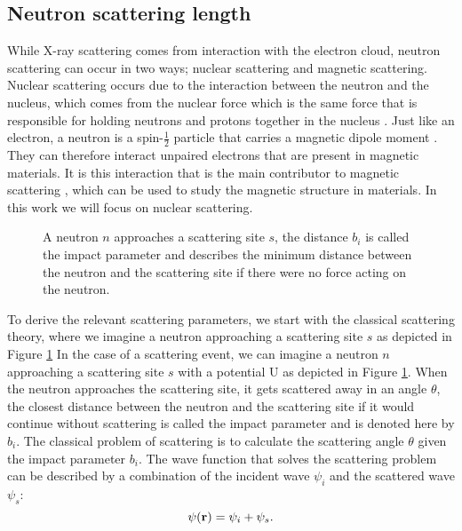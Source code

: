 \subsection{Neutron scattering length}
While X-ray scattering comes from interaction with the electron cloud, neutron scattering can occur in two ways; nuclear scattering and magnetic scattering.  Nuclear scattering occurs due to the interaction between the neutron and the nucleus, which comes from the nuclear force which is the same force that is responsible for holding neutrons and protons together in the nucleus \cite{magnetic_scattering_lee}. Just like an electron, a neutron is a spin-$\frac{1}{2}$ particle that carries a magnetic dipole moment \cite{magneticscattering}. They can therefore interact unpaired electrons that are present in magnetic materials. It is this interaction that is the main  contributor to magnetic scattering \cite{magnetic_scattering_lee}, which can be used to study the magnetic structure in materials. In this work we will focus on nuclear scattering.\\
\begin{figure}[b]
	\centering
	\def\svgwidth{\textwidth}
	
	\caption{A neutron $n$ approaches a scattering site $s$, the distance $b_i$ is called the impact parameter and describes the minimum distance between the neutron and the scattering site if there were no force acting on the neutron.}
	\label{classic_scattering}
\end{figure}
To derive the relevant scattering parameters, we start with the classical scattering theory, where we imagine a neutron approaching a scattering site $s$ as depicted in Figure \ref{classic_scattering}
In the case of a scattering event, we can imagine a neutron $n$ approaching a scattering site $s$ with a potential U as depicted in Figure \ref{classic_scattering}.  When the neutron approaches the scattering site, it gets scattered away in an angle $\theta$, the closest distance between the neutron and the scattering site if it would continue without scattering is called the impact parameter \cite{thornton} and is denoted here by $b_i$. The classical problem of scattering is to calculate the scattering angle $\theta$ given the impact parameter $b_i$. The wave function that solves the scattering problem can be described by a combination of the incident wave $\psi_i$ and the scattered wave $\psi_s$:
\begin{equation}\label{schrodinger_general}
	\psi(\vb{r}) = \psi_i + \psi_s.
\end{equation}
